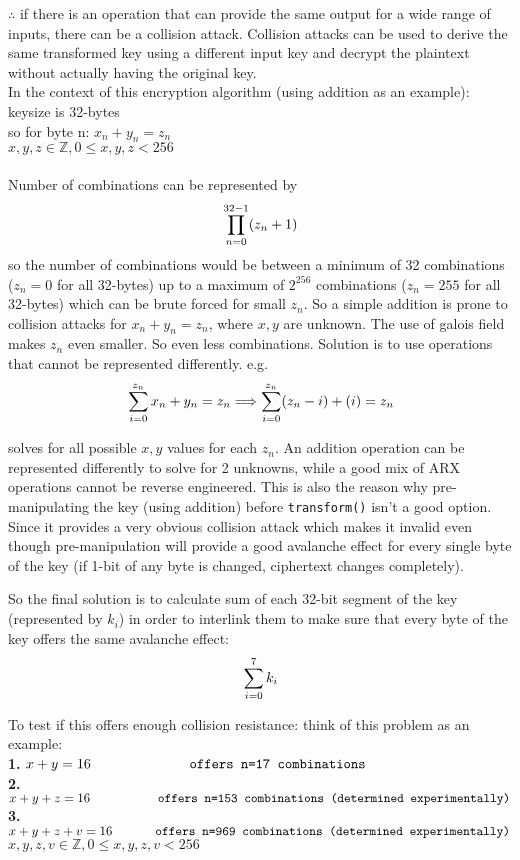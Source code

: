 \documentclass[fleqn, a4paper,12pt]{article}
\begin{document}
$\therefore$ if there is an operation that can provide the same output for a wide range of inputs, there can be a collision attack. Collision attacks can be used to derive the same transformed key using a different input key and decrypt the plaintext without actually having the original key.
\\
In the context of this encryption algorithm (using addition as an example): keysize is 32-bytes
\\
so for byte n: $x_n + y_n = z_n$\\
$ x,y,z \in \mathbb{Z}, 0 \leq x,y,z < 256$\\
\\
Number of combinations can be represented by 
\[
\\		\prod_{n=0}^{32-1}(z_n+1)
\]
\small so the number of combinations would be between a minimum of 32 combinations ($z_n=0$ for all 32-bytes) up to a maximum of $2^{256}$ combinations ($z_n = 255$ for all 32-bytes) which can be brute forced for small $z_n$. So a simple addition is prone to collision attacks for $x_n+y_n=z_n$, where $x,y$ are unknown. The use of galois field makes $z_n$ even smaller. So even less combinations. Solution is to use operations that cannot be represented differently. e.g.
\[
\\\sum_{i=0}^{z_n} x_n + y_n = z_n \Longrightarrow
\sum_{i=0}^{z_n} (z_n-i)+(i) = z_n
\]

solves for all possible $x, y$ values for each $z_n$. An addition operation can be represented differently to solve for 2 unknowns, while a good mix of ARX operations cannot be reverse engineered. This is also the reason why pre-manipulating the key (using addition) before \texttt{transform()} isn't a good option. Since it provides a very obvious collision attack which makes it invalid even though pre-manipulation will provide a good avalanche effect for every single byte of the key (if 1-bit of any byte is changed, ciphertext changes completely).

So the final solution is to calculate sum of each 32-bit segment of the key (represented by $k_i$) in order to interlink them to make sure that every byte of the key offers the same avalanche effect:
\[
\\\sum_{i=0}^{7} k_i
\]

To test if this offers enough collision resistance: think of this problem as an example:
\\
\textbf{1.} $x+y=16 \texttt{\hspace{2.3cm} offers n=17 combinations}$\\
\textbf{2.} $x+y+z=16 \texttt{\hspace{1.7cm} offers n=153 combinations (determined experimentally)}$\\
\textbf{3.} $x+y+z+v=16 \texttt{\hspace{1cm} offers n=969 combinations (determined experimentally)}$\\
$x,y,z,v \in \mathbb{Z}, 0 \leq x,y,z,v < 256$\\
\end{document}
